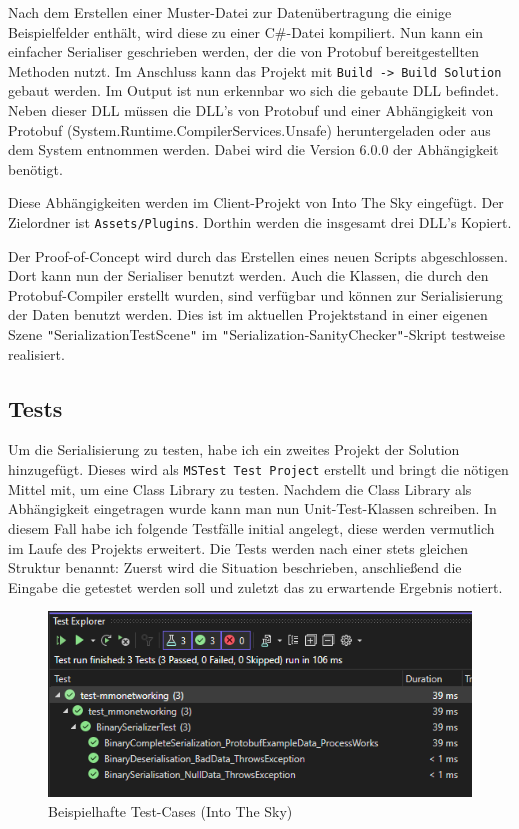 Nach dem Erstellen einer Muster-Datei zur Datenübertragung die einige Beispielfelder enthält, wird diese zu einer C\#-Datei kompiliert. Nun kann ein einfacher Serialiser geschrieben werden, der die von Protobuf bereitgestellten Methoden nutzt. Im Anschluss kann das Projekt mit \verb|Build -> Build Solution| gebaut werden. Im Output ist nun erkennbar wo sich die gebaute DLL befindet. Neben dieser DLL müssen die DLL's von Protobuf und einer Abhängigkeit von Protobuf (System.Runtime.CompilerServices.Unsafe) heruntergeladen oder aus dem System entnommen werden. Dabei wird die Version 6.0.0 der Abhängigkeit benötigt.

Diese Abhängigkeiten werden im Client-Projekt von Into The Sky eingefügt. Der Zielordner ist \verb|Assets/Plugins|. Dorthin werden die insgesamt drei DLL's Kopiert.

Der Proof-of-Concept wird durch das Erstellen eines neuen Scripts abgeschlossen. Dort kann nun der Serialiser benutzt werden. Auch die Klassen, die durch den Protobuf-Compiler erstellt wurden, sind verfügbar und können zur Serialisierung der Daten benutzt werden. Dies ist im aktuellen Projektstand in einer eigenen Szene \verb|"|SerializationTestScene\verb|"| im \verb|"|Serialization-SanityChecker\verb|"|-Skript testweise realisiert. 


\subsection{Tests}

Um die Serialisierung zu testen, habe ich ein zweites Projekt der Solution hinzugefügt. Dieses wird als \verb|MSTest Test Project| erstellt und bringt die nötigen Mittel mit, um eine Class Library zu testen. Nachdem die Class Library als Abhängigkeit eingetragen wurde kann man nun Unit-Test-Klassen schreiben. In diesem Fall habe ich folgende Testfälle initial angelegt, diese werden vermutlich im Laufe des Projekts erweitert. Die Tests werden nach einer stets gleichen Struktur benannt: Zuerst wird die Situation beschrieben, anschließend die Eingabe die getestet werden soll und zuletzt das zu erwartende Ergebnis notiert.

\begin{figure}[!h]
	\centering
	\includegraphics[width=16cm]{figures/intotheskytests.png}
	\caption{Beispielhafte Test-Cases (Into The Sky)}
	\label{fig:networkingstructure}
\end{figure}

